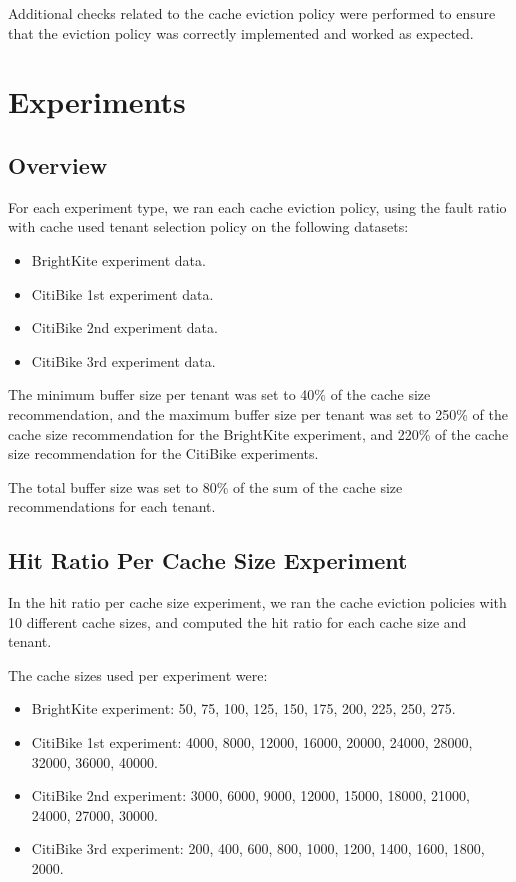 Additional checks related to the cache eviction policy were performed to ensure that the 
eviction policy was correctly implemented and worked as expected.

\section{Experiments}

\subsection{Overview}

For each experiment type, we ran each cache eviction policy, using the fault ratio with 
cache used tenant selection policy on the following datasets:

\begin{itemize}
    \item BrightKite experiment data.
    \item CitiBike 1st experiment data.
    \item CitiBike 2nd experiment data.
    \item CitiBike 3rd experiment data.
\end{itemize}

The minimum buffer size per tenant was set to 40\% of the cache size recommendation, and the
maximum buffer size per tenant was set to 250\% of the cache size recommendation for the 
BrightKite experiment, and 220\% of the cache size recommendation for the CitiBike experiments.

The total buffer size was set to 80\% of the sum of the cache size recommendations for each 
tenant.

\subsection{Hit Ratio Per Cache Size Experiment}

In the hit ratio per cache size experiment, we ran the cache eviction policies with 10 different
cache sizes, and computed the hit ratio for each cache size and tenant.

The cache sizes used per experiment were:

\begin{itemize}
    \item BrightKite experiment: 50, 75, 100, 125, 150, 175, 200, 225, 250, 275.
    \item CitiBike 1st experiment: 4000, 8000, 12000, 16000, 20000, 24000, 28000, 32000, 36000, 40000.
    \item CitiBike 2nd experiment: 3000, 6000, 9000, 12000, 15000, 18000, 21000, 24000, 27000, 30000.
    \item CitiBike 3rd experiment: 200, 400, 600, 800, 1000, 1200, 1400, 1600, 1800, 2000.
\end{itemize}

